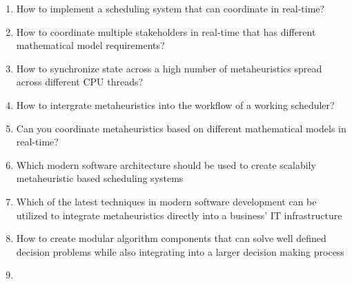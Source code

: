 
  \begin{enumerate}[label=\arabic*.]
    \item How to implement a scheduling system that can coordinate in real-time?
	\item How to coordinate multiple stakeholders in real-time that has different mathematical model requirements?
	\item How to synchronize state across a high number of metaheuristics spread across different CPU threads?
	\item How to intergrate metaheuristics into the workflow of a working scheduler?
    \item Can you coordinate metaheuristics based on different mathematical models in real-time?
	\item Which modern software architecture should be used to create scalabily metaheuristic based scheduling systems
	\item Which of the latest techniques in modern software development can be utilized to integrate metaheuristics directly into a business' IT infrastructure
	\item How to create modular algorithm components that can solve well defined decision problems while also integrating into a larger decision making process
	\item 
  \end{enumerate}
